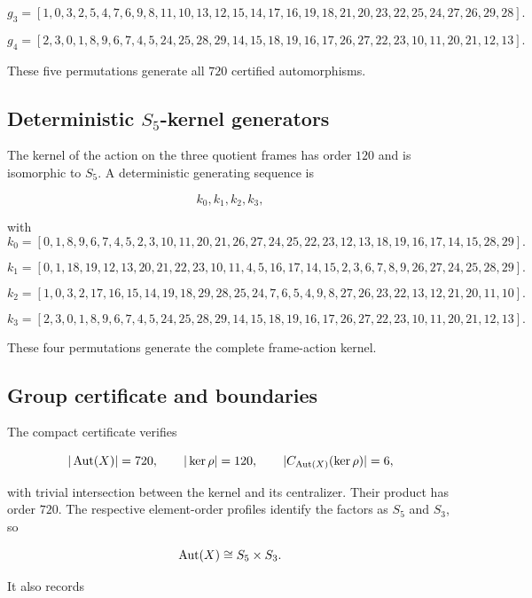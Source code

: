 \[
g_3
=
\left[
  1, 0, 3, 2, 5, 4, 7, 6, 9, 8,
  11, 10, 13, 12, 15, 14, 17, 16, 19, 18,
  21, 20, 23, 22, 25, 24, 27, 26, 29, 28
\right].
\]

\[
g_4
=
\left[
  2, 3, 0, 1, 8, 9, 6, 7, 4, 5,
  24, 25, 28, 29, 14, 15, 18, 19, 16, 17,
  26, 27, 22, 23, 10, 11, 20, 21, 12, 13
\right].
\]

These five permutations generate all \(720\) certified automorphisms.

\subsection{Deterministic \(S_5\)-kernel generators}

The kernel of the action on the three quotient frames has order \(120\)
and is isomorphic to \(S_5\). A deterministic generating sequence is

\[
k_0,k_1,k_2,k_3,
\]

with
\[
k_0
=
\left[
  0, 1, 8, 9, 6, 7, 4, 5, 2, 3,
  10, 11, 20, 21, 26, 27, 24, 25, 22, 23,
  12, 13, 18, 19, 16, 17, 14, 15, 28, 29
\right].
\]

\[
k_1
=
\left[
  0, 1, 18, 19, 12, 13, 20, 21, 22, 23,
  10, 11, 4, 5, 16, 17, 14, 15, 2, 3,
  6, 7, 8, 9, 26, 27, 24, 25, 28, 29
\right].
\]

\[
k_2
=
\left[
  1, 0, 3, 2, 17, 16, 15, 14, 19, 18,
  29, 28, 25, 24, 7, 6, 5, 4, 9, 8,
  27, 26, 23, 22, 13, 12, 21, 20, 11, 10
\right].
\]

\[
k_3
=
\left[
  2, 3, 0, 1, 8, 9, 6, 7, 4, 5,
  24, 25, 28, 29, 14, 15, 18, 19, 16, 17,
  26, 27, 22, 23, 10, 11, 20, 21, 12, 13
\right].
\]

These four permutations generate the complete frame-action kernel.

\subsection{Group certificate and boundaries}

The compact certificate verifies

\[
|\operatorname{Aut}(X)|=720,
\qquad
|\ker\rho|=120,
\qquad
|C_{\operatorname{Aut}(X)}(\ker\rho)|=6,
\]

with trivial intersection between the kernel and its centralizer. Their
product has order \(720\). The respective element-order profiles identify
the factors as \(S_5\) and \(S_3\), so

\[
\operatorname{Aut}(X)\cong S_5\times S_3.
\]

It also records

